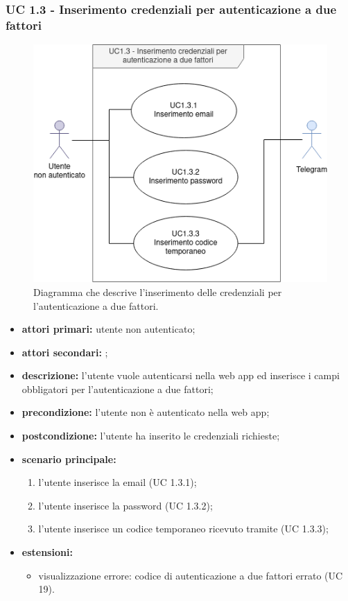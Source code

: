 		\subsubsection{UC 1.3 - Inserimento credenziali per autenticazione a due fattori}

		\begin{figure}[H]
			\centering
			\includegraphics[scale=0.675]{res/images/uc1.3}
			\caption{Diagramma che descrive l'inserimento delle credenziali per l'autenticazione a due fattori.}
		\end{figure}

		\begin{itemize}
			\item \textbf{attori primari:} utente non autenticato;
			\item \textbf{attori secondari:} ;
			\item \textbf{descrizione:} l'utente vuole autenticarsi nella web app ed inserisce i campi obbligatori per l'autenticazione a due fattori;
			\item \textbf{precondizione:} l'utente non è autenticato nella web app;
			\item \textbf{postcondizione:} l'utente ha inserito le credenziali richieste;
			\item \textbf{scenario principale:}
				\begin{enumerate}
					\item l'utente inserisce la email (UC 1.3.1);
					\item l'utente inserisce la password (UC 1.3.2);
					\item l'utente inserisce un codice temporaneo ricevuto tramite  (UC 1.3.3);
				\end{enumerate}
			\item \textbf{estensioni:}
				\begin{itemize}
					\item visualizzazione errore: codice di autenticazione a due fattori errato (UC 19).
				\end{itemize}
		\end{itemize}

